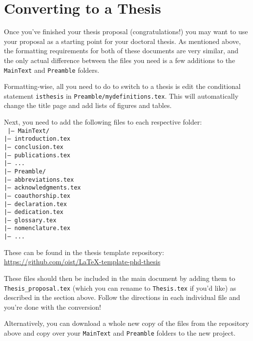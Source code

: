 \section{Converting to a Thesis}

Once you've finished your thesis proposal (congratulations!) you may want
to use your proposal as a starting point for your doctoral thesis. As
mentioned above, the formatting requirements for both of these documents
are very similar, and the only actual difference between the files you need
is a few additions to the \texttt{MainText} and \texttt{Preamble} folders.

Formatting-wise, all you need to do to switch to a thesis is edit the
conditional statement \texttt{isthesis} in \texttt{Preamble/mydefinitions.tex}.
This will automatically change the title page and add lists of figures
and tables.

Next, you need to add the following files to each respective folder:
\\
\texttt{
|--- MainText/ \\ 
\hspace*{0.5cm}|--- introduction.tex\\
\hspace*{0.5cm}|--- conclusion.tex\\
\hspace*{0.5cm}|--- publications.tex\\
\hspace*{0.5cm}|--- ...\\
|--- Preamble/ \\ 
\hspace*{0.5cm}|--- abbreviations.tex\\
\hspace*{0.5cm}|--- acknowledgments.tex\\
\hspace*{0.5cm}|--- coauthorship.tex\\
\hspace*{0.5cm}|--- declaration.tex\\
\hspace*{0.5cm}|--- dedication.tex\\
\hspace*{0.5cm}|--- glossary.tex\\
\hspace*{0.5cm}|--- nomenclature.tex\\
\hspace*{0.5cm}|--- ...\\
}

These can be found in the thesis template repository:
\url{https://github.com/oist/LaTeX-template-phd-thesis}

These files should then be included in the main document by adding them
to \texttt{Thesis\_proposal.tex} (which you can rename to \texttt{Thesis.tex}
if you'd like) as described in the section above. Follow the directions
in each individual file and you're done with the conversion!

Alternatively, you can download a whole new copy of the files from the
repository above and copy over your \texttt{MainText} and \texttt{Preamble}
folders to the new project.
